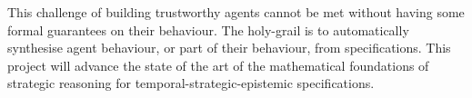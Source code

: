 \documentclass[a4paper,12pt,smallheadings]{scrartcl}
\begin{document}
This challenge of building trustworthy agents cannot be met without having some formal guarantees on their 
behaviour. The holy-grail is to automatically synthesise agent behaviour, or part of their behaviour, from 
specifications. This project will advance the state of the art of the mathematical foundations of strategic reasoning for temporal-strategic-epistemic specifications.



\end{document}
